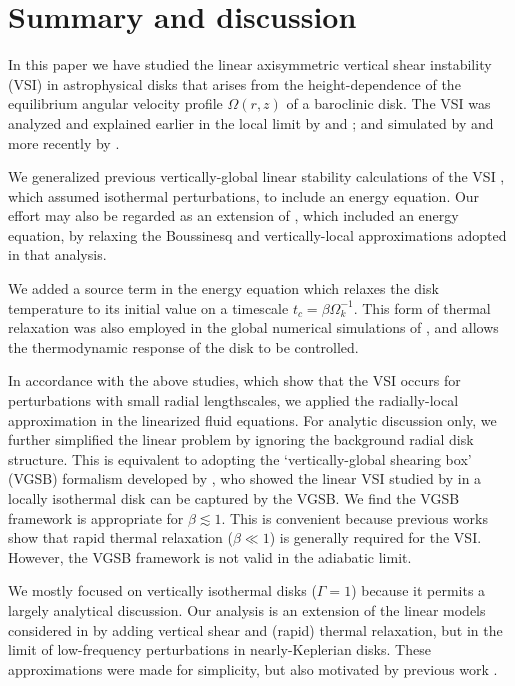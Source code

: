 \section{Summary and discussion}\label{summary}
In this paper we have studied the linear axisymmetric vertical shear
instability (VSI) in astrophysical disks that arises from the
height-dependence of the equilibrium angular velocity profile
$\Omega(r,z)$ of a baroclinic disk. The VSI was analyzed and
explained earlier in the local limit by \cite{urpin98} and
\cite{urpin03}; and simulated by \cite{arlt04} and more recently by
\cite{nelson13}.     

We generalized previous vertically-global linear stability calculations
of the VSI \citep{nelson13,mcnally14}, which assumed isothermal
perturbations, to include an energy equation. Our effort may also be
regarded as an extension of \cite{urpin03}, which included an energy
equation, by relaxing the Boussinesq and vertically-local
approximations adopted in that analysis.    

We added a source term in the energy equation which relaxes the disk
temperature to its initial value on a timescale $t_c=\beta\Omega_k^{-1}$. This
form of thermal relaxation was also employed in the global numerical
simulations of \cite{nelson13}, and allows the thermodynamic response
of the disk to be controlled.  

In accordance with the above studies, which show that the VSI occurs for 
perturbations with small radial lengthscales, we applied the 
radially-local approximation in the linearized fluid equations. For
analytic discussion only, we further simplified the linear problem by
ignoring the background radial disk structure. This is equivalent to adopting
the `vertically-global shearing box' (VGSB) formalism developed by
\cite{mcnally14}, who showed the linear VSI studied by
\cite{nelson13} in a locally isothermal disk can be captured by the
VGSB. We find the VGSB framework is appropriate for $\beta\lesssim1$. 
This is convenient because previous works show that rapid thermal
relaxation ($\beta\ll1$) is generally required for the VSI. However,
the VGSB framework is not valid in the adiabatic limit. 
   

We mostly focused on vertically isothermal disks ($\Gamma=1$) because
it permits a largely analytical discussion. Our analysis is an
extension of the linear models considered in \cite{lubow93} by
adding vertical shear and (rapid) thermal relaxation, but in the limit of low-frequency
perturbations in nearly-Keplerian disks. These approximations were
made for simplicity, but also motivated by previous work
\citep{nelson13}.   

